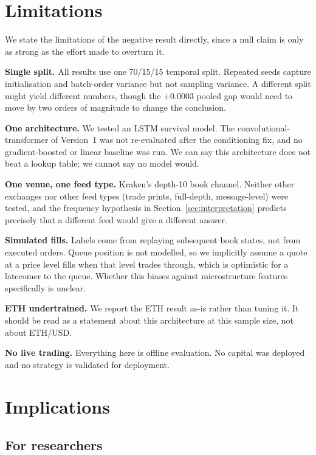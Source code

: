 \documentclass[11pt]{article}
\begin{document}
\section{Limitations}

We state the limitations of the negative result directly, since a null claim is
only as strong as the effort made to overturn it.

\textbf{Single split.} All results use one 70/15/15 temporal split. Repeated
seeds capture initialisation and batch-order variance but not sampling
variance. A different split might yield different numbers, though the
$+0.0003$ pooled gap would need to move by two orders of magnitude to change the
conclusion.

\textbf{One architecture.} We tested an LSTM survival model. The
convolutional-transformer of Version~1 was not re-evaluated after the
conditioning fix, and no gradient-boosted or linear baseline was run. We can say
this architecture does not beat a lookup table; we cannot say no model would.

\textbf{One venue, one feed type.} Kraken's depth-10 book channel. Neither
other exchanges nor other feed types (trade prints, full-depth, message-level)
were tested, and the frequency hypothesis in
Section~\ref{sec:interpretation} predicts precisely that a different feed would
give a different answer.

\textbf{Simulated fills.} Labels come from replaying subsequent book states, not
from executed orders. Queue position is not modelled, so we implicitly assume
a quote at a price level fills when that level trades through, which is
optimistic for a latecomer to the queue. Whether this biases against microstructure features
specifically is unclear.

\textbf{ETH undertrained.} We report the ETH result as-is rather than tuning
it. It should be read as a statement about this architecture at this sample
size, not about ETH/USD.

\textbf{No live trading.} Everything here is offline evaluation. No capital was
deployed and no strategy is validated for deployment.

\section{Implications}

\subsection{For researchers}
\end{document}
